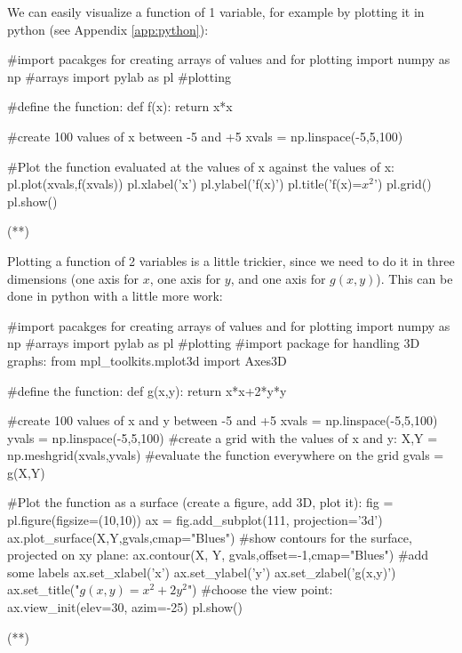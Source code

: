 We can easily visualize a function of 1 variable, for example by plotting it in python (see Appendix \ref{app:python}):
\begin{python}[caption = Plotting a function of 1 variable]
#import pacakges for creating arrays of values and for plotting
import numpy as np #arrays
import pylab as pl #plotting

#define the function:
def f(x):
    return x*x
    
#create 100 values of x between -5 and +5
xvals = np.linspace(-5,5,100)

#Plot the function evaluated at the values of x against the values of x:
pl.plot(xvals,f(xvals))
pl.xlabel('x')
pl.ylabel('f(x)')
pl.title('f(x)=$x^2$')
pl.grid()
pl.show()
\end{python}
\begin{poutput}
(**)
\end{poutput}

Plotting a function of 2 variables is a little trickier, since we need to do it in three dimensions (one axis for $x$, one axis for $y$, and one axis for $g(x,y)$). This can be done in python with a little more work:
\begin{python}[caption = Plotting a function of 2 variables]
#import pacakges for creating arrays of values and for plotting
import numpy as np #arrays
import pylab as pl #plotting
#import package for handling 3D graphs:
from mpl_toolkits.mplot3d import Axes3D

#define the function:
def g(x,y):
    return x*x+2*y*y
    
#create 100 values of x and y between -5 and +5
xvals = np.linspace(-5,5,100)
yvals = np.linspace(-5,5,100)
#create a grid with the values of x and y:
X,Y = np.meshgrid(xvals,yvals)
#evaluate the function everywhere on the grid
gvals = g(X,Y)

#Plot the function as a surface (create a figure, add 3D, plot it):
fig = pl.figure(figsize=(10,10))
ax = fig.add_subplot(111, projection='3d')
ax.plot_surface(X,Y,gvals,cmap="Blues")
#show contours for the surface, projected on xy plane:
ax.contour(X, Y, gvals,offset=-1,cmap="Blues")
#add some labels
ax.set_xlabel('x')
ax.set_ylabel('y')
ax.set_zlabel('g(x,y)')
ax.set_title("$g(x,y)=x^2+2y^2$")
#choose the view point:
ax.view_init(elev=30, azim=-25)
pl.show()
\end{python}
\begin{poutput}
(**)
\end{poutput}

